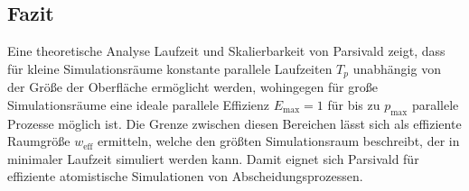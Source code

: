 \subsection{Fazit}

Eine theoretische Analyse Laufzeit und Skalierbarkeit von Parsivald zeigt, dass für kleine Simulationsräume konstante parallele Laufzeiten $T_p$ unabhängig von der Größe der Oberfläche ermöglicht werden, wohingegen für große Simulationsräume eine ideale parallele Effizienz $E_\text{max} = 1$ für bis zu $p_\text{max}$ parallele Prozesse möglich ist.
Die Grenze zwischen diesen Bereichen lässt sich als effiziente Raumgröße $w_\text{eff}$ ermitteln, welche den größten Simulationsraum beschreibt, der in minimaler Laufzeit simuliert werden kann.
Damit eignet sich Parsivald für effiziente atomistische Simulationen von Abscheidungsprozessen.
